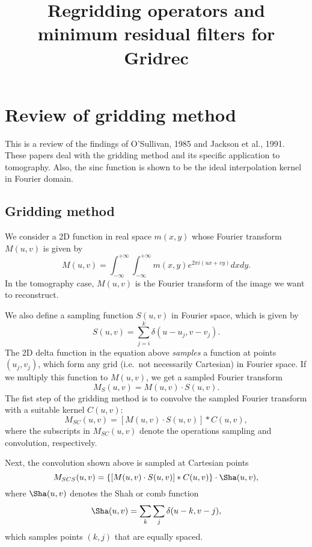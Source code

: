 \documentclass[11pt]{article}
\title{Regridding operators and minimum residual filters for Gridrec}
\begin{document}
\maketitle
\tableofcontents
\section{Review of gridding method}

This is a review of the findings of O'Sullivan, 1985 and Jackson et al., 1991. These papers deal with the gridding method and its specific application to tomography. Also, the sinc function is shown to be the ideal interpolation kernel in Fourier domain. 
\subsection{Gridding method}
We consider a 2D function in real space $m(x,y)$ whose Fourier transform $M(u,v)$ is given by
\begin{equation}
M(u,v) = \int_{-\infty}^{+\infty} \int_{-\infty}^{+\infty} m(x,y) e^{2\pi i (ux+vy)} dx dy.
\end{equation}
In the tomography case, $M(u,v)$ is the Fourier transform of the image we want to reconstruct.

We also define a sampling function $S(u,v)$ in Fourier space, which is given by
\begin{equation}
S(u,v) = \sum_{j=i}^{k} \delta(u-u_j, v-v_j).
\end{equation}
The 2D delta function in the equation above \emph{samples} a function at points $(u_j, v_j)$, which form any grid (i.e.~not necessarily Cartesian) in Fourier space. If we multiply this function to $M(u,v)$, we get a sampled Fourier transform
\begin{equation}
M_S(u,v) = M(u,v) \cdot S(u,v).
\end{equation}
The fist step of the gridding method is to convolve the sampled Fourier transform with a suitable kernel $C(u,v)$:
\begin{equation}
M_{SC}(u,v) = [M(u,v) \cdot S(u,v)] \ast C(u,v),
\end{equation}
where the subscripts in $M_{SC}(u,v)$ denote the operations sampling and convolution, respectively. 

Next, the convolution shown above is sampled at Cartesian points
\begin{equation}
M_{SCS}(u,v) = \{[M(u,v) \cdot S(u,v)] \ast C(u,v)\} \cdot \Sha(u,v),
\end{equation}
where $\Sha(u,v)$ denotes the Shah or comb function
\begin{equation}
\Sha(u,v) = \sum_{k} \sum_{j} \delta(u-k,v-j),
\end{equation}
which samples points $(k,j)$ that are equally spaced.
\end{document}
